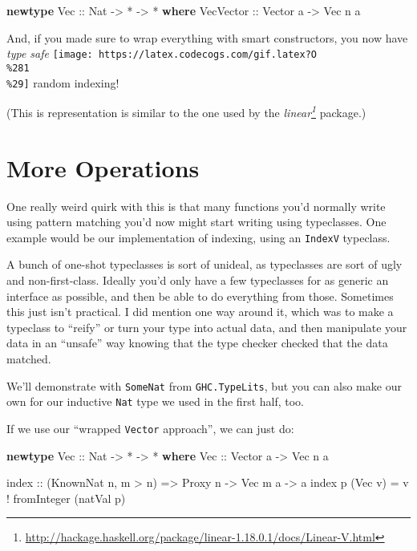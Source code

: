 \documentclass[]{article}
\newenvironment{Shaded}{}{}
\newcommand{\KeywordTok}[1]{\textcolor[rgb]{0.00,0.44,0.13}{\textbf{#1}}}
\newcommand{\DataTypeTok}[1]{\textcolor[rgb]{0.56,0.13,0.00}{#1}}
\newcommand{\OtherTok}[1]{\textcolor[rgb]{0.00,0.44,0.13}{#1}}
\newcommand{\FunctionTok}[1]{\textcolor[rgb]{0.02,0.16,0.49}{#1}}
\newcommand{\NormalTok}[1]{#1}
\renewcommand{\href}[2]{#2\footnote{\url{#1}}}
\begin{document}
\begin{Shaded}
\begin{Highlighting}[]
\KeywordTok{newtype} \DataTypeTok{Vec}\OtherTok{ ::} \DataTypeTok{Nat} \OtherTok{->} \FunctionTok{*} \OtherTok{->} \FunctionTok{*} \KeywordTok{where}
    \DataTypeTok{VecVector}\OtherTok{ ::} \DataTypeTok{Vector}\NormalTok{ a }\OtherTok{->} \DataTypeTok{Vec}\NormalTok{ n a}
\end{Highlighting}
\end{Shaded}

And, if you made sure to wrap everything with smart constructors, you now have
\emph{type safe}
\texttt{[image: https://latex.codecogs.com/gif.latex?O\\\%281\\\%29]} random
indexing!

(This is representation is similar to the one used by the
\emph{\href{http://hackage.haskell.org/package/linear-1.18.0.1/docs/Linear-V.html}{linear}}
package.)

\section{More Operations}\label{more-operations}

One really weird quirk with this is that many functions you'd normally write
using pattern matching you'd now might start writing using typeclasses. One
example would be our implementation of indexing, using an \texttt{IndexV}
typeclass.

A bunch of one-shot typeclasses is sort of unideal, as typeclasses are sort of
ugly and non-first-class. Ideally you'd only have a few typeclasses for as
generic an interface as possible, and then be able to do everything from those.
Sometimes this just isn't practical. I did mention one way around it, which was
to make a typeclass to ``reify'' or turn your type into actual data, and then
manipulate your data in an ``unsafe'' way knowing that the type checker checked
that the data matched.

We'll demonstrate with \texttt{SomeNat} from \texttt{GHC.TypeLits}, but you can
also make our own for our inductive \texttt{Nat} type we used in the first half,
too.

If we use our ``wrapped \texttt{Vector} approach'', we can just do:

\begin{Shaded}
\begin{Highlighting}[]
\KeywordTok{newtype} \DataTypeTok{Vec}\OtherTok{ ::} \DataTypeTok{Nat} \OtherTok{->} \FunctionTok{*} \OtherTok{->} \FunctionTok{*} \KeywordTok{where}
    \DataTypeTok{Vec}\OtherTok{ ::} \DataTypeTok{Vector}\NormalTok{ a }\OtherTok{->} \DataTypeTok{Vec}\NormalTok{ n a}

\NormalTok{index}\OtherTok{ ::}\NormalTok{ (}\DataTypeTok{KnownNat}\NormalTok{ n, m }\FunctionTok{>}\NormalTok{ n) }\OtherTok{=>} \DataTypeTok{Proxy}\NormalTok{ n }\OtherTok{->} \DataTypeTok{Vec}\NormalTok{ m a }\OtherTok{->}\NormalTok{ a}
\NormalTok{index p (}\DataTypeTok{Vec}\NormalTok{ v) }\FunctionTok{=}\NormalTok{ v }\FunctionTok{!}\NormalTok{ fromInteger (natVal p)}
\end{Highlighting}
\end{Shaded}
\end{document}
